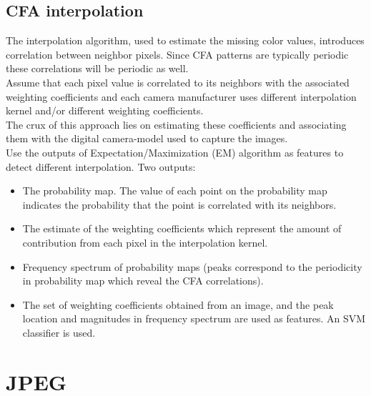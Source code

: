 \documentclass[10pt,a4paper]{book}
\begin{document}
\subsection{CFA interpolation}
The interpolation algorithm, used to estimate the missing color values, introduces correlation between neighbor pixels. Since CFA patterns are typically periodic these correlations will be periodic as well.\\
Assume that each pixel value is correlated to its neighbors with the associated weighting coefficients and each camera manufacturer uses different interpolation kernel and/or different weighting
coefficients. \\
The crux of this approach lies on estimating these coefficients and associating them with the digital camera-model used to capture the images.\\
Use the outputs of Expectation/Maximization (EM) algorithm as features to detect different interpolation.
Two outputs:
\begin{itemize}
\item  The probability map. The value of each point on the probability map indicates the probability that the point is correlated with its neighbors.
\item  The estimate of the weighting coefficients which represent the amount of contribution from each pixel in the interpolation kernel.
\item  Frequency spectrum of probability maps (peaks correspond to the periodicity in probability map which reveal the CFA correlations).
\item  The set of weighting coefficients obtained from an image, and the peak location and magnitudes in frequency spectrum are used as features. An SVM classifier is used.
\end{itemize}
\newpage
\section{JPEG}
\end{document}
